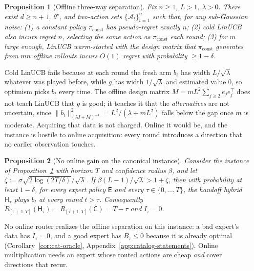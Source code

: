 \documentclass{article}
\newtheorem{proposition}{Proposition}
\theoremstyle{definition}
\theoremstyle{remark}
\theoremstyle{remark}
\newcommand{\Cold}{\mathsf{C}}
\newcommand{\Exp}{\mathsf{E}}
\newcommand{\Hyb}{\mathsf{H}}
\begin{document}
\begin{proposition}[Offline three-way separation]
\label{prop:three-way}
Fix $n\ge1$, $L>1$, $\lambda>0$. There exist $d\ge n+1$, $\theta^\star$, and
two-action sets $\{\mathcal A_t\}_{t=1}^n$ such that, for any sub-Gaussian
noise: (1) a constant policy $\pi_{\mathrm{const}}$ has pseudo-regret exactly
$n$; (2) cold LinUCB also incurs regret $n$, selecting the same action as
$\pi_{\mathrm{const}}$ each round; (3) for $m$ large enough, LinUCB
warm-started with the design matrix that $\pi_{\mathrm{const}}$ generates from
$mn$ \emph{offline} rollouts incurs $O(1)$ regret with probability $\ge1-\delta$.
\end{proposition}

Cold LinUCB fails because at each round the fresh arm $b_t$ has width
$L/\sqrt\lambda$ whatever was played before, while $g$ has width
$1/\sqrt\lambda$ and estimated value $0$, so optimism picks $b_t$ every time.
The offline design matrix $M=mL^2\sum_{j\ge2}e_je_j^\top$ does not teach
LinUCB that $g$ is good; it teaches it that the \emph{alternatives} are not
uncertain, since $\|b_t\|^2_{(\lambda I+M)^{-1}}=L^2/(\lambda+mL^2)$ falls
below the gap once $m$ is moderate. Acquiring that data is not charged.
Online it would be, and the instance is hostile to online acquisition: every
round introduces a direction that no earlier observation touches.

\begin{proposition}[No online gain on the canonical instance]
\label{prop:one-pass}
Consider the instance of Proposition~\ref{prop:three-way} with horizon $T$
and confidence radius $\beta$, and let $\zeta:=\sigma\sqrt{2\log(2T/\delta)}/\sqrt\lambda$.
If $\beta(L-1)/\sqrt\lambda>1+\zeta$, then with probability at least
$1-\delta$, for \emph{every} expert policy $\Exp$ and every $\tau\in\{0,\dots,T\}$,
the handoff hybrid $\Hyb_\tau$ plays $b_t$ at every round $t>\tau$. Consequently
$R_{[\tau+1,T]}(\Hyb_\tau)=R_{[\tau+1,T]}(\Cold)=T-\tau$ and $I_\tau=0$.
\end{proposition}

No online router realizes the offline separation on this instance: a bad
expert's data has $I_\tau=0$, and a good expert has $B_\tau\le0$ because it is
already optimal (Corollary~\ref{cor:cat-oracle},
Appendix~\ref{app:catalog-statements}). Online multiplication needs an expert
whose routed actions are cheap \emph{and} cover directions that recur.
\end{document}

